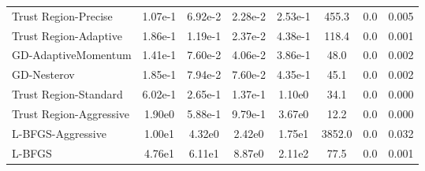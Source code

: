 \documentclass{article}
\begin{document}
\begin{table}[htbp]
{\begin{tabular}{p{2.5cm}*{7}{c}}
Trust Region-Precise & 1.07e-1 & 6.92e-2 & 2.28e-2 & 2.53e-1 & 455.3 & 0.0 & 0.005 \\
Trust Region-Adaptive & 1.86e-1 & 1.19e-1 & 2.37e-2 & 4.38e-1 & 118.4 & 0.0 & 0.001 \\
GD-AdaptiveMomentum & 1.41e-1 & 7.60e-2 & 4.06e-2 & 3.86e-1 & 48.0 & 0.0 & 0.002 \\
GD-Nesterov & 1.85e-1 & 7.94e-2 & 7.60e-2 & 4.35e-1 & 45.1 & 0.0 & 0.002 \\
Trust Region-Standard & 6.02e-1 & 2.65e-1 & 1.37e-1 & 1.10e0 & 34.1 & 0.0 & 0.000 \\
Trust Region-Aggressive & 1.90e0 & 5.88e-1 & 9.79e-1 & 3.67e0 & 12.2 & 0.0 & 0.000 \\
L-BFGS-Aggressive & 1.00e1 & 4.32e0 & 2.42e0 & 1.75e1 & 3852.0 & 0.0 & 0.032 \\
L-BFGS & 4.76e1 & 6.11e1 & 8.87e0 & 2.11e2 & 77.5 & 0.0 & 0.001 \\
\bottomrule
\end{tabular}
}
\end{table}
\end{document}
